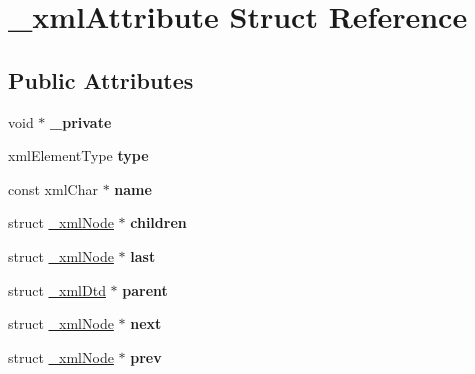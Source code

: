 \hypertarget{struct__xmlAttribute}{
\section{\_\-xmlAttribute Struct Reference}
\label{struct__xmlAttribute}
}
\subsection*{Public Attributes}
\begin{DoxyCompactItemize}
\item 
\hypertarget{struct__xmlAttribute_a3db7f8ae253ee907711d1377ef688bc0}{
void $\ast$ {\bfseries \_\-private}}
\label{struct__xmlAttribute_a3db7f8ae253ee907711d1377ef688bc0}

\item 
\hypertarget{struct__xmlAttribute_af3ca1a0e47ae810fbb710a8f07ea70cc}{
xmlElementType {\bfseries type}}
\label{struct__xmlAttribute_af3ca1a0e47ae810fbb710a8f07ea70cc}

\item 
\hypertarget{struct__xmlAttribute_a35a0be8bbf112f3409ab47a45f2a33af}{
const xmlChar $\ast$ {\bfseries name}}
\label{struct__xmlAttribute_a35a0be8bbf112f3409ab47a45f2a33af}

\item 
\hypertarget{struct__xmlAttribute_ab523ec1bd56b4f5c1867890ec6098e8f}{
struct \hyperlink{struct__xmlNode}{\_\-xmlNode} $\ast$ {\bfseries children}}
\label{struct__xmlAttribute_ab523ec1bd56b4f5c1867890ec6098e8f}

\item 
\hypertarget{struct__xmlAttribute_ae3ef54ca4afda8aea53163857d2685bf}{
struct \hyperlink{struct__xmlNode}{\_\-xmlNode} $\ast$ {\bfseries last}}
\label{struct__xmlAttribute_ae3ef54ca4afda8aea53163857d2685bf}

\item 
\hypertarget{struct__xmlAttribute_acf4b2fe0cbc2f1d4cbc839f23231fd24}{
struct \hyperlink{struct__xmlDtd}{\_\-xmlDtd} $\ast$ {\bfseries parent}}
\label{struct__xmlAttribute_acf4b2fe0cbc2f1d4cbc839f23231fd24}

\item 
\hypertarget{struct__xmlAttribute_aaf451d7856b880bbf981889eae9c2828}{
struct \hyperlink{struct__xmlNode}{\_\-xmlNode} $\ast$ {\bfseries next}}
\label{struct__xmlAttribute_aaf451d7856b880bbf981889eae9c2828}

\item 
\hypertarget{struct__xmlAttribute_a7c8303adaaafa913f726f7fd557fc480}{
struct \hyperlink{struct__xmlNode}{\_\-xmlNode} $\ast$ {\bfseries prev}}
\label{struct__xmlAttribute_a7c8303adaaafa913f726f7fd557fc480}


\end{DoxyCompactItemize}
